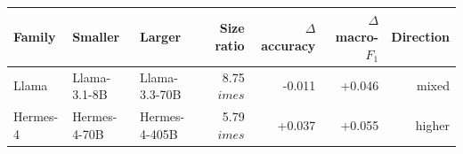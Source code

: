 \begin{tabular}{@{}lllrrrr@{}}
\toprule
Family & Smaller & Larger & Size ratio & $\Delta$ accuracy & $\Delta$ macro-$F_1$ & Direction \\
\midrule
Llama & Llama-3.1-8B & Llama-3.3-70B & 8.75$	imes$ & -0.011 & +0.046 & mixed \\
Hermes-4 & Hermes-4-70B & Hermes-4-405B & 5.79$	imes$ & +0.037 & +0.055 & higher \\
\bottomrule
\end{tabular}
